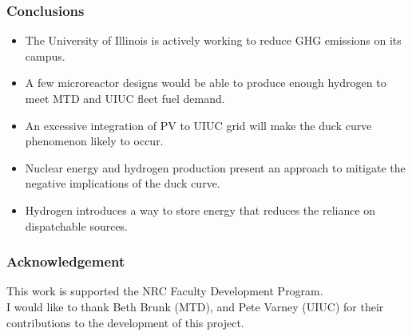 \begin{frame}
\frametitle{Conclusions}

\begin{itemize}
	\item The University of Illinois is actively working to reduce GHG emissions on its campus. 
	\item A few microreactor designs would be able to produce enough hydrogen to meet MTD and UIUC fleet fuel demand.
	\item An excessive integration of PV to UIUC grid will make the duck curve phenomenon likely to occur.
	\item Nuclear energy and hydrogen production present an approach to mitigate the negative implications of the duck curve.
	\item Hydrogen introduces a way to store energy that reduces the reliance on dispatchable sources.

\end{itemize}
\end{frame}


\begin{frame}
\frametitle{Acknowledgement}

This work is supported the NRC Faculty Development Program.
\\
I would like to thank Beth Brunk (MTD), and Pete Varney (UIUC) for their contributions to the development of this project.

\end{frame}